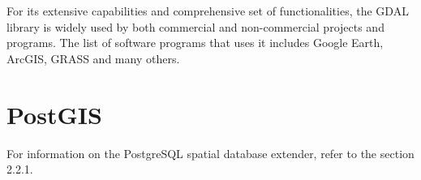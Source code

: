   For its extensive capabilities and comprehensive set of
  functionalities, the GDAL library is widely used by both
  commercial and non-commercial  projects and programs. The
  list of software programs that uses it includes Google Earth,
  ArcGIS, GRASS  and many others.\cite{gdalogr}

  
  \section{PostGIS}
  
  For information on the PostgreSQL spatial database extender, refer to the section 2.2.1.

